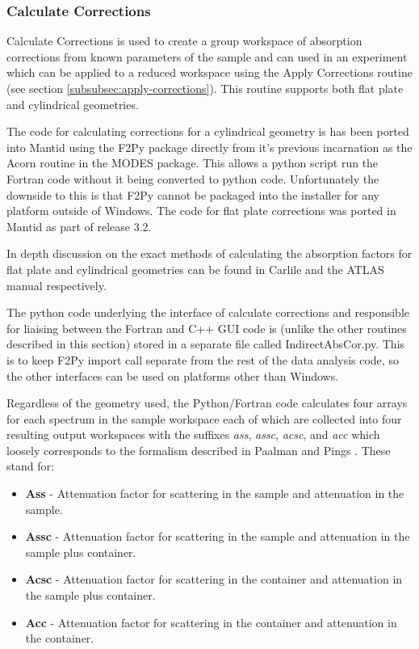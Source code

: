 \documentclass[paper=a4, fontsize=11pt]{scrartcl}	%
\numberwithin{equation}{section}															%
\numberwithin{figure}{section}																%
\numberwithin{table}{section}																%
\begin{document}
\subsubsection{Calculate Corrections}
Calculate Corrections is used to create a group workspace of absorption corrections from known parameters of the sample and can used in an experiment which can be applied to a reduced workspace using the Apply Corrections routine (see section \ref{subsubsec:apply-corrections}). This routine supports both flat plate and cylindrical geometries.

The code for calculating corrections for a cylindrical geometry is has been ported into Mantid using the F2Py package directly from it's previous incarnation as the Acorn routine in the MODES package. This allows a python script run the Fortran code without it being converted to python code. Unfortunately the downside to this is that F2Py cannot be packaged into the installer for any platform outside of Windows. The code for flat plate corrections was ported in Mantid as part of release 3.2.

In depth discussion on the exact methods of calculating the absorption factors for flat plate and cylindrical geometries can be found in Carlile \cite{ccarlile1974} and the ATLAS manual \cite{aksoper1989} respectively.

The python code underlying the interface of calculate corrections and responsible for liaising between the Fortran and C++ GUI code is (unlike the other routines described in this section) stored in a separate file called IndirectAbsCor.py. This is to keep F2Py import call separate from the rest of the data analysis code, so the other interfaces can be used on platforms other than Windows.

Regardless of the geometry used, the Python/Fortran code calculates four arrays for each spectrum in the sample workspace each of which are collected into four resulting output workspaces with the suffixes \textit{ass}, \textit{assc}, \textit{acsc}, and \textit{acc} which loosely corresponds to the formalism described in Paalman and Pings \cite{hhpaalman1962}. These stand for:

\begin{itemize}
\item \textbf{Ass} - Attenuation factor for scattering in the sample and attenuation in the sample.
\item \textbf{Assc} - Attenuation factor for scattering in the sample and attenuation in the sample plus container.
\item \textbf{Acsc} - Attenuation factor for scattering in the container and attenuation in the sample plus container.
\item \textbf{Acc} - Attenuation factor for scattering in the container and attenuation in the container.
\end{itemize}
\end{document}
